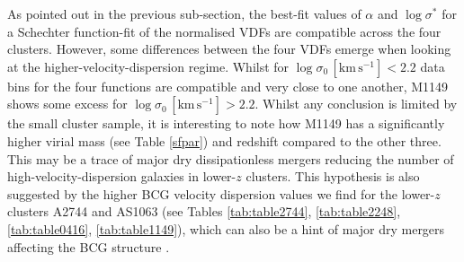 \documentclass{aa}
\begin{document}
As pointed out in the previous sub-section, the best-fit values of $\alpha$ and $\log\sigma^*$ for a Schechter function-fit of the normalised VDFs are compatible across the four clusters. However, some differences between the four VDFs emerge when looking at the higher-velocity-dispersion regime. Whilst for $\log\sigma_0\, [\mathrm{km\,s^{-1}}]<2.2$ data bins for the four functions are compatible and very close to one another, M1149 shows some excess for $\log\sigma_0\, [\mathrm{km\,s^{-1}}]>2.2$. Whilst any conclusion is limited by the small cluster sample, it is interesting to note how M1149 has a significantly higher virial mass (see Table \ref{sfpar}) and redshift compared to the other three. This may be a trace of major dry dissipationless mergers \citep[see e.g.][]{khochfar03,bolyan06,delucia07,naab09} reducing the number of high-velocity-dispersion galaxies in lower-$z$ clusters. This hypothesis is also suggested by the higher BCG velocity dispersion values we find for the lower-$z$ clusters A2744 and AS1063 (see Tables \ref{tab:table2744}, \ref{tab:table2248}, \ref{tab:table0416}, \ref{tab:table1149}), which can also be a hint of major dry mergers affecting the BCG structure \citep[][]{cox06}.
\end{document}

